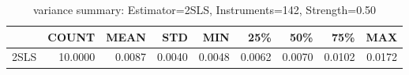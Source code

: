 \begin{table}[ht]
\centering
\caption{variance summary: Estimator=2SLS, Instruments=142, Strength=0.50}
\begin{tabular}{lrrrrrrrr}
\toprule
 & COUNT & MEAN & STD & MIN & 25\% & 50\% & 75\% & MAX \\
\midrule
2SLS & 10.0000 & 0.0087 & 0.0040 & 0.0048 & 0.0062 & 0.0070 & 0.0102 & 0.0172 \\
\bottomrule
\end{tabular}
\end{table}
